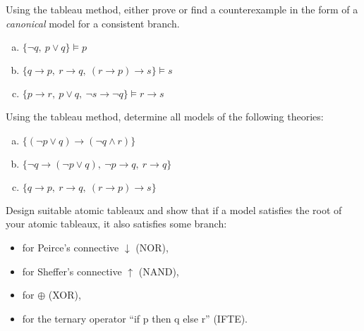 \begin{problem}
    
    Using the tableau method, either prove or find a counterexample in the form of a \emph{canonical} model for a consistent branch.
    \begin{enumerate}[(a)]
        \item $\{ \neg q,\ p \vee q\} \models p$
        \item $\{ q \to p,\ r \to q,\ (r \to p) \to s\} \models s$
        \item $\{ p \to r,\ p \vee q,\ \neg s \to \neg q\} \models r \to s$
    \end{enumerate}

\end{problem}


\begin{problem}

    Using the tableau method, determine all models of the following theories:
    \begin{enumerate}[(a)]
        \item $\{(\neg p \vee q) \to (\neg q \wedge r)\}$
        \item $\{\neg q \to (\neg p \vee q),\ \neg p \to q,\ r \to q\}$
        \item $\{ q \to p,\ r \to q,\ (r \to p) \to s\}$
    \end{enumerate}

\end{problem}


\begin{problem} 
    Design suitable atomic tableaux and show that if a model satisfies the root of your atomic tableaux, it also satisfies some branch:
    \begin{itemize}
        \item for Peirce's connective $\downarrow$ (NOR),
        \item for Sheffer's connective $\uparrow$ (NAND),
        \item for $\oplus$ (XOR),
        \item for the ternary operator ``if p then q else r'' (IFTE).
    \end{itemize}  
    
\end{problem}


